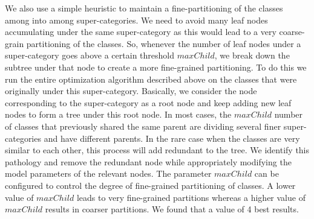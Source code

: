 \documentclass[10pt,twocolumn,letterpaper]{article}
\begin{document}
We also use a simple heuristic to maintain a fine-partitioning of the classes
among into among super-categories.  We need to avoid many leaf nodes
accumulating under the same super-category as this would lead to a very
coarse-grain partitioning of the classes.  So, whenever the number of leaf
nodes under a super-category goes above a certain threshold $maxChild$, we
break down the subtree under that node to create a more fine-grained
partitioning.  To do this we run the entire optimization algorithm described
above on the classes that were originally under this super-category. Basically,
we consider the node corresponding to the super-category as a root node
and keep adding new leaf nodes to form a tree under this root node. In
most cases, the $maxChild$ number of classes that previously shared the
same parent are dividing several finer super-categories and have
different parents.  In the rare case when the classes are very similar to
each other, this process will add redundant to the tree. We identify this
pathology and remove the redundant node while appropriately modifying the
model parameters of the relevant nodes. The parameter $maxChild$ can be
configured to control the degree of fine-grained partitioning of classes.
A lower value of $maxChild$ leads to very fine-grained partitions whereas
a higher value of $maxChild$ results in coarser partitions. We found that
a value of 4  best results. 


{\small
  
  
}
\end{document}
